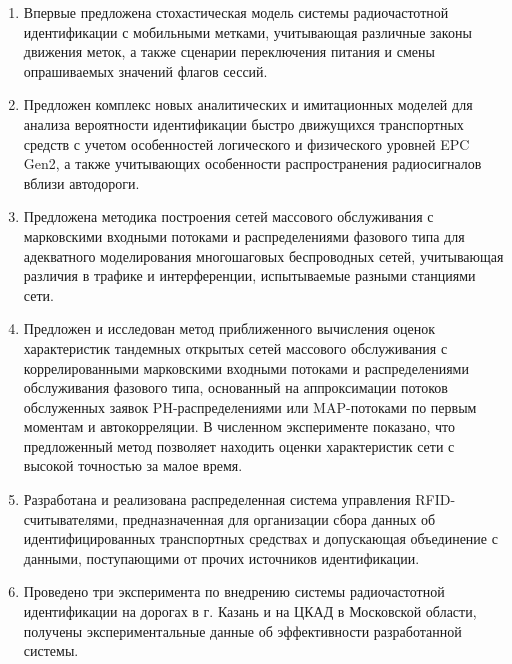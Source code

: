 {\novelty}
\begin{enumerate}[beginpenalty=10000] %
  \item Впервые предложена стохастическая модель системы радиочастотной идентификации с мобильными метками, учитывающая различные законы движения меток, а также сценарии переключения питания и смены опрашиваемых значений флагов сессий.
  \item Предложен комплекс новых аналитических и имитационных моделей для анализа вероятности идентификации быстро движущихся транспортных средств с учетом особенностей логического и физического уровней EPC Gen2, а также учитывающих особенности распространения радиосигналов вблизи автодороги.
  \item Предложена методика построения сетей массового обслуживания с марковскими входными потоками и распределениями фазового типа для адекватного моделирования многошаговых беспроводных сетей, учитывающая различия в трафике и интерференции, испытываемые разными станциями сети.
  \item Предложен и исследован метод приближенного вычисления оценок характеристик тандемных открытых сетей массового обслуживания с коррелированными марковскими входными потоками и распределениями обслуживания фазового типа, основанный на аппроксимации потоков обслуженных заявок PH-распределениями или MAP-потоками по первым моментам и автокорреляции. В численном эксперименте показано, что предложенный метод позволяет находить оценки характеристик сети с высокой точностью за малое время.
  \item Разработана и реализована распределенная система управления RFID-считывателями, предназначенная для организации сбора данных об идентифицированных транспортных средствах и допускающая объединение с данными, поступающими от прочих источников идентификации.
  \item Проведено три эксперимента по внедрению системы радиочастотной идентификации на дорогах в г. Казань и на ЦКАД в Московской области, получены экспериментальные данные об эффективности разработанной системы.
\end{enumerate}


